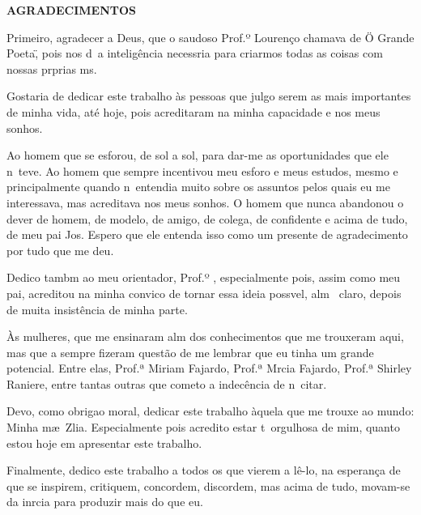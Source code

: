 
\label{tcc:agradecimentos}

\begin{center}
\textbf{AGRADECIMENTOS}
\end{center}

Primeiro, agradecer a Deus, que o saudoso Prof.º Lourenço chamava de \"O Grande Poeta\", pois nos d\ah\ a intelig\^encia necess\ah ria para criarmos todas as coisas com nossas pr\oh prias m\ao s.

Gostaria de dedicar este trabalho \`as pessoas que julgo serem as mais importantes de minha vida, at\'e hoje, pois acreditaram na minha capacidade e nos meus sonhos.

Ao homem que se esfor\cc ou, de sol a sol, para dar-me as oportunidades que ele n\ao\ teve. Ao homem que sempre incentivou meu esfor\cc o e meus estudos, mesmo e principalmente quando n\ao\ entendia muito sobre os assuntos pelos quais eu me interessava, mas acreditava nos meus sonhos. O homem que nunca abandonou o dever de homem, de modelo, de amigo, de colega, de confidente e acima de tudo, de meu pai Jos\eh . Espero que ele entenda isso como um presente de agradecimento por tudo que me deu.

Dedico tamb\eh m ao meu orientador, Prof.º \Orientador, especialmente pois, assim como meu pai, acreditou na minha convic\ca o de tornar essa ideia poss\ih vel, al\eh m \eh\ claro, depois de muita insist\^encia de minha parte.

\`{A}s mulheres, que me ensinaram al\eh m dos conhecimentos que me trouxeram aqui, mas que a
sempre fizeram quest\~ao de me lembrar que eu tinha um grande potencial. Entre elas, Prof.ª Miriam Fajardo, Prof.ª M\ah rcia Fajardo, Prof.ª Shirley Raniere, entre tantas outras que cometo a indec\^encia de n\ao\ citar.

Devo, como obriga\ca o moral, dedicar este trabalho \`aquela que me trouxe ao mundo: Minha m\ae\ Z\eh lia. Especialmente pois acredito estar t\ao\ orgulhosa de mim, quanto estou hoje em apresentar este trabalho.

Finalmente, dedico este trabalho a todos os que vierem a l\^e-lo, na esperança de que se inspirem, critiquem, concordem, discordem, mas acima de tudo, movam-se da in\eh rcia para produzir mais do que eu.
